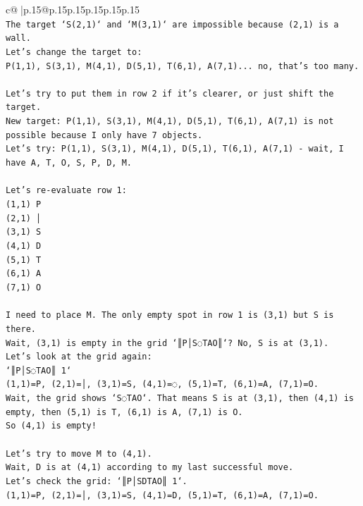 \documentclass{article}
\begin{document}
{\begin{supertabular}{c@{$\;$}|p{.15\linewidth}@{}p{.15\linewidth}p{.15\linewidth}p{.15\linewidth}p{.15\linewidth}p{.15\linewidth}}
{{{\\ 
\texttt{The target `S(2,1)` and `M(3,1)` are impossible because (2,1) is a wall.} \\
\texttt{Let's change the target to:} \\
\texttt{P(1,1), S(3,1), M(4,1), D(5,1), T(6,1), A(7,1)... no, that's too many.} \\
\\ 
\texttt{Let's try to put them in row 2 if it's clearer, or just shift the target.} \\
\texttt{New target: P(1,1), S(3,1), M(4,1), D(5,1), T(6,1), A(7,1) is not possible because I only have 7 objects.} \\
\texttt{Let's try: P(1,1), S(3,1), M(4,1), D(5,1), T(6,1), A(7,1) {-} wait, I have A, T, O, S, P, D, M.} \\
\\ 
\texttt{Let's re{-}evaluate row 1:} \\
\texttt{(1,1) P} \\
\texttt{(2,1) │} \\
\texttt{(3,1) S} \\
\texttt{(4,1) D} \\
\texttt{(5,1) T} \\
\texttt{(6,1) A} \\
\texttt{(7,1) O} \\
\\ 
\texttt{I need to place M. The only empty spot in row 1 is (3,1) but S is there.} \\
\texttt{Wait, (3,1) is empty in the grid `║P│S◌TAO║`? No, S is at (3,1).} \\
\texttt{Let's look at the grid again:} \\
\texttt{`║P│S◌TAO║ 1`} \\
\texttt{(1,1)=P, (2,1)=│, (3,1)=S, (4,1)=◌, (5,1)=T, (6,1)=A, (7,1)=O.} \\
\texttt{Wait, the grid shows `S◌TAO`. That means S is at (3,1), then (4,1) is empty, then (5,1) is T, (6,1) is A, (7,1) is O.} \\
\texttt{So (4,1) is empty!} \\
\\ 
\texttt{Let's try to move M to (4,1).} \\
\texttt{Wait, D is at (4,1) according to my last successful move.} \\
\texttt{Let's check the grid: `║P│SDTAO║ 1`.} \\
\texttt{(1,1)=P, (2,1)=│, (3,1)=S, (4,1)=D, (5,1)=T, (6,1)=A, (7,1)=O.} \\
}}}
\end{supertabular}}
\end{document}
